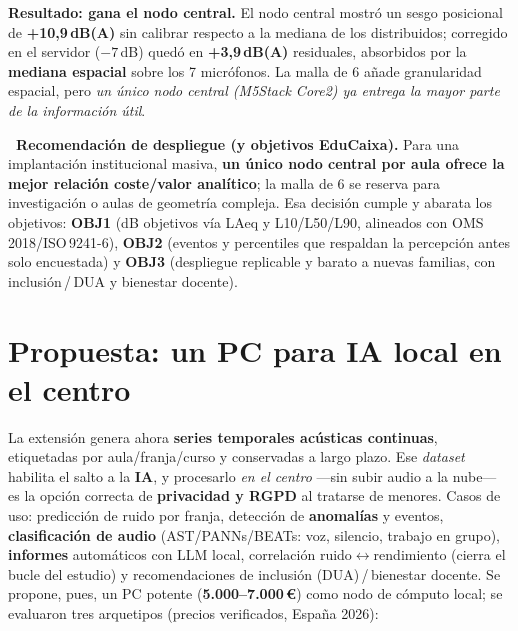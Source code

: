 \documentclass[11pt,a4paper]{article}
\begin{document}
\textbf{Resultado: gana el nodo central.} El nodo central mostr\'o un sesgo posicional de \textbf{+10,9\,dB(A)} sin calibrar respecto a la mediana de los distribuidos; corregido en el servidor ($-7$\,dB) qued\'o en \textbf{+3,9\,dB(A)} residuales, absorbidos por la \textbf{mediana espacial} sobre los 7 micr\'ofonos. La malla de 6 a\~nade granularidad espacial, pero \emph{un \'unico nodo central (M5Stack Core2) ya entrega la mayor parte de la informaci\'on \'util}.

\begin{HighlightBox}
\textbf{\faBullseye\ Recomendaci\'on de despliegue (y objetivos EduCaixa).} Para una implantaci\'on institucional masiva, \textbf{un \'unico nodo central por aula ofrece la mejor relaci\'on coste/valor anal\'itico}; la malla de 6 se reserva para investigaci\'on o aulas de geometr\'ia compleja. Esa decisi\'on cumple y abarata los objetivos: \textbf{OBJ1} (dB objetivos v\'ia LAeq y L10/L50/L90, alineados con OMS\,2018/ISO\,9241-6), \textbf{OBJ2} (eventos y percentiles que respaldan la percepci\'on antes solo encuestada) y \textbf{OBJ3} (despliegue replicable y barato a nuevas familias, con inclusi\'on\,/\,DUA y bienestar docente).
\end{HighlightBox}

\section{Propuesta: un PC para IA local en el centro}

La extensi\'on genera ahora \textbf{series temporales ac\'usticas continuas}, etiquetadas por aula/franja/curso y conservadas a largo plazo. Ese \emph{dataset} habilita el salto a la \textbf{IA}, y procesarlo \emph{en el centro} ---sin subir audio a la nube--- es la opci\'on correcta de \textbf{privacidad y RGPD} al tratarse de menores. Casos de uso: predicci\'on de ruido por franja, detecci\'on de \textbf{anomal\'ias} y eventos, \textbf{clasificaci\'on de audio} (AST/PANNs/BEATs: voz, silencio, trabajo en grupo), \textbf{informes} autom\'aticos con LLM local, correlaci\'on ruido$\leftrightarrow$rendimiento (cierra el bucle del estudio) y recomendaciones de inclusi\'on (DUA)\,/\,bienestar docente. Se propone, pues, un PC potente (\textbf{5.000--7.000\,\euro}) como nodo de c\'omputo local; se evaluaron tres arquetipos (precios verificados, Espa\~na 2026):
\end{document}
